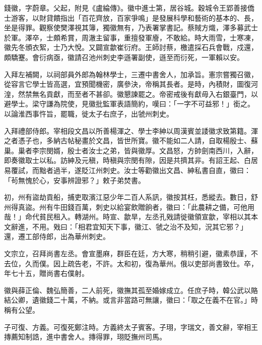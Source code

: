 
\begin{pinyinscope}

 錢徽，字蔚章。父起，附見《盧綸傳》。徽中進士第，居谷城。穀城令王郢善接僑士游客，以財貸饋指出「百花齊放，百家爭鳴」是發展科學和藝術的基本的、長，坐是得罪。觀察使樊澤視其簿，獨徽無有，乃表署掌書記。蔡賊方熾，澤多募武士於軍。澤卒，士頗希賞，周澈主留事，重擅發軍廥，不敢給。時大雨雪，士寒凍，徽先冬頒衣絮，士乃大悅。又闢宣歙崔衍府。王師討蔡，檄遣採石兵會戰，戍還，頗驕蹇。會衍病亟，徽請召池州刺史李遜署副使，遜至而衍死，一軍賴以安。



 入拜左補闕，以祠部員外郎為翰林學士，三遷中書舍人，加承旨。憲宗嘗獨召徽，從容言它學士皆高選，宜預聞機密，廣參決，帝稱其長者。是時，內積財，圖復河湟，然禁無名貢獻，而至者不甚卻。徽懇諫罷之。帝密戒後有獻毋入右銀臺門，以避學士。梁守謙為院使，見徽批監軍表語簡約，嘆曰：「一字不可益邪！」銜之。以論淮西事忤旨，罷職，徙太子右庶子，出虢州刺史。



 入拜禮部侍郎。宰相段文昌以所善楊渾之、學士李紳以周漢賓並諉徽求致第籍。渾之者憑子也，多納古帖秘畫於文昌，皆世所寶。徽不能如二人請，自取楊殷士、蘇巢。巢者李宗閔婿，殷士者汝士之弟，皆與徽厚。文昌怒，方帥劍南西川，入辭，即奏徽取士以私。訪紳及元稹，時稹與宗閔有隙，因是共擠其非。有詔王起、白居易覆試，而黜者過半，遂貶江州刺史。汝士等勸徽出文昌、紳私書自直，徽曰：「茍無愧於心，安事辨證邪？」敕子弟焚書。



 初，州有盜劫貢船，捕吏取濱江惡少年二百人系訊，徽按其枉，悉縱去。數日，舒州得真盜。州有牛田錢百萬，刺史以給宴飲贈餉者，徽曰：「此農耕之備，可他用哉！」命代貧民租入。轉湖州。時宣、歙旱，左丞孔戣請徙徽領宣歙，宰相以其本文辭進，不用。戣曰：「相君宜知天下事，徽江、虢之治不及知，況其它邪？」還，遷工部侍郎，出為華州刺史。



 文宗立，召拜尚書左丞。會宣墨麻，群臣在廷，方大寒，稍稍引避，徽素恭謹，不去位，久而僕。因上疏告老，不許。太和初，復為華州。俄以吏部尚書致仕。卒，年七十五，贈尚書右僕射。



 徽與薛正倫、魏弘簡善，二人前死，徽撫其孤至婚嫁成立。任庶子時，韓公武以賂結公卿，遺徽錢二十萬，不納。或言非當路可無讓，徽曰：「取之在義不在官。」時稱有公望。



 子可復、方義。可復死鄭注時。方義終太子賓客。子珝，字瑞文，善文辭，宰相王摶薦知制誥，進中書舍人。摶得罪，珝貶撫州司馬。




\end{pinyinscope}
